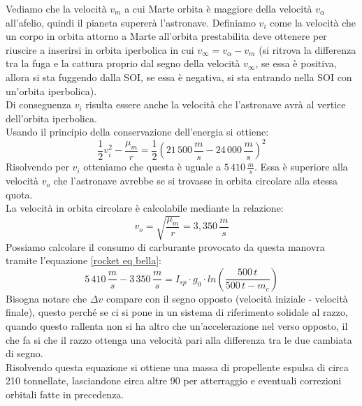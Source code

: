 Vediamo che la velocità $v_m$ a cui Marte orbita è maggiore della velocità $v_\alpha$ all'afelio, quindi il pianeta supererà l'astronave. Definiamo $v_i$ come la velocità che un corpo in orbita attorno a Marte all'orbita prestabilita deve ottenere per riuscire a inserirsi in orbita iperbolica in cui $v_\infty = v_\alpha - v_m$ (si ritrova la differenza tra la fuga e la cattura proprio dal segno della velocità $v_\infty$, se essa è positiva, allora si sta fuggendo dalla SOI, se essa è negativa, si sta entrando nella SOI con un'orbita iperbolica).\\
Di conseguenza $v_i$ risulta essere anche la velocità che l'astronave avrà al vertice dell'orbita iperbolica.\\
Usando il principio della conservazione dell'energia si ottiene:
$$
\frac{1}{2}v_i^2 - \frac{\mu_m}{r} = \frac{1}{2}\left(21\,500\,\frac{m}{s} - 24\,000\,\frac{m}{s}\right)^2
$$
Risolvendo per $v_i$ otteniamo che questa è uguale a $5\,410\,\frac{m}{s}$. Essa è superiore alla velocità $v_o$ che l'astronave avrebbe se si trovasse in orbita circolare alla stessa quota.\\
La velocità in orbita circolare è calcolabile mediante la relazione:
$$
v_o = \sqrt{\frac{\mu_m}{r}} = 3,350\,\frac{m}{s}
$$
Possiamo calcolare il consumo di carburante provocato da questa manovra tramite l'equazione \ref{rocket eq bella}:
$$
5\,410\,\frac{m}{s}-3\,350\,\frac{m}{s} = I_{sp} \cdot g_0 \cdot ln\left(\frac{500\,t}{500\,t - m_c}\right)
$$
Bisogna notare che $\Delta v$ compare con il segno opposto (velocità iniziale - velocità finale), questo perché se ci si pone in un sistema di riferimento solidale al razzo, quando questo rallenta non si ha altro che un'accelerazione nel verso opposto, il che fa si che il razzo ottenga una velocità pari alla differenza tra le due cambiata di segno.\\
Risolvendo questa equazione si ottiene una massa di propellente espulsa di circa 210 tonnellate, lasciandone circa altre 90 per atterraggio e eventuali correzioni orbitali fatte in precedenza.
